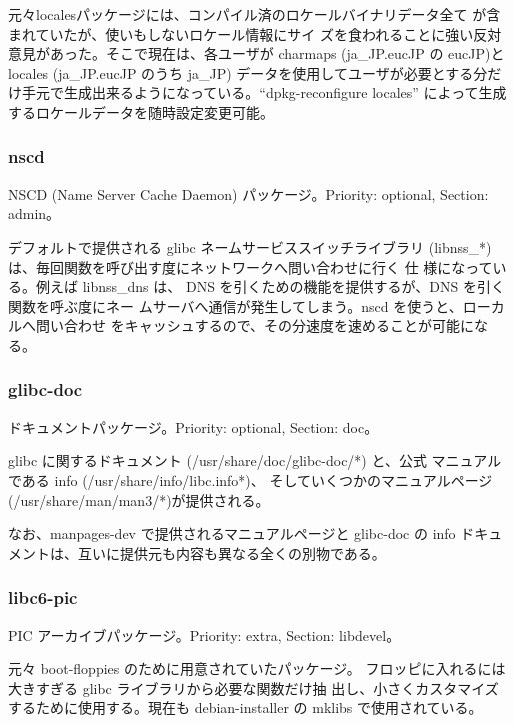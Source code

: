 \documentclass[mingoth]{jsarticle}
\begin{document}
    元々localesパッケージには、コンパイル済のロケールバイナリデータ全て
    が含まれていたが、使いもしないロケール情報にサイ
    ズを食われることに強い反対意見があった。そこで現在は、各ユーザが 
    charmaps (ja\_JP.eucJP の eucJP)とlocales (ja\_JP.eucJP のうち ja\_JP) 
    データを使用してユーザが必要とする分だけ手元で生成出来るようになっている。``dpkg-reconfigure
    locales'' によって生成するロケールデータを随時設定変更可能。

  \subsubsection{nscd}

    NSCD (Name Server Cache Daemon) パッケージ。Priority: optional, Section: admin。

    デフォルトで提供される glibc ネームサービススイッチライブラリ
    (libnss\_*) は、毎回関数を呼び出す度にネットワークへ問い合わせに行く
    仕
    様になっている。例えば libnss\_dns は、
    DNS を引くための機能を提供するが、DNS を引く関数を呼ぶ度にネー
    ムサーバへ通信が発生してしまう。nscd を使うと、ローカルへ問い合わせ
    をキャッシュするので、その分速度を速めることが可能になる。

  \subsubsection{glibc-doc}

    ドキュメントパッケージ。Priority: optional, Section: doc。

    glibc に関するドキュメント (/usr/share/doc/glibc-doc/*) と、公式
    マニュアルである info (/usr/share/info/libc.info*)、
    そしていくつかのマニュアルページ (/usr/share/man/man3/*)が提供される。

    なお、manpages-dev で提供されるマニュアルページと glibc-doc の info 
    ドキュメントは、互いに提供元も内容も異なる全くの別物である。

  \subsubsection{libc6-pic}

    PIC アーカイブパッケージ。Priority: extra, Section: libdevel。

    元々 boot-floppies のために用意されていたパッケージ。
    フロッピに入れるには大きすぎる glibc ライブラリから必要な関数だけ抽
    出し、小さくカスタマイズするために使用する。現在も debian-installer の
    mklibs で使用されている。
\end{document}
